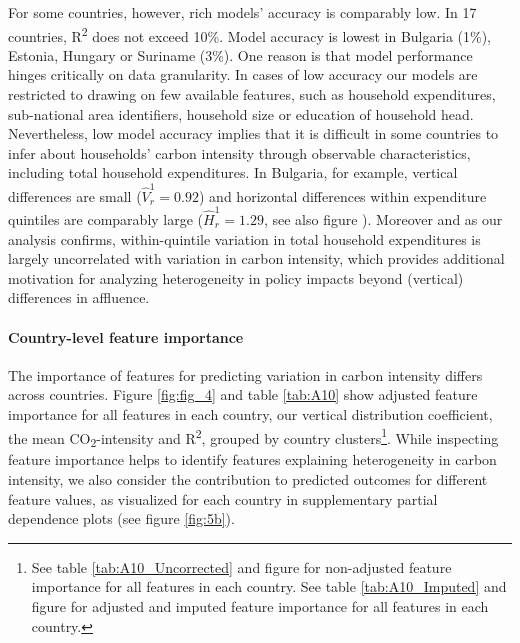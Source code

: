 \documentclass[12pt, a4paper]{article}
\begin{document}
For some countries, however, rich models' accuracy is comparably low. In 17 countries, R\textsuperscript{2} does not exceed 10\%. Model accuracy is lowest in Bulgaria (1\%), Estonia, Hungary or Suriname (3\%). One reason is that model performance hinges critically on data granularity. In cases of low accuracy our models are restricted to drawing on few available features, such as household expenditures, sub-national area identifiers, household size or education of household head. Nevertheless, low model accuracy implies that it is difficult in some countries to infer about households' carbon intensity through observable characteristics, including total household expenditures. In Bulgaria, for example, vertical differences are small ($\widehat{V}_{r}^{1}=0.92$) and horizontal differences within expenditure quintiles are comparably large ($\widehat{H}_{r}^{1}=1.29$, see also figure ). Moreover and as our analysis confirms, within-quintile variation in total household expenditures is largely uncorrelated with variation in carbon intensity, which provides additional motivation for analyzing heterogeneity in policy impacts beyond (vertical) differences in affluence.

\paragraph{Country-level feature importance}
The importance of features for predicting variation in carbon intensity differs across countries. Figure \ref{fig:fig_4} and table \ref{tab:A10} show adjusted feature importance for all features in each country, our vertical distribution coefficient, the mean CO\textsubscript{2}-intensity and R\textsuperscript{2}, grouped by country clusters\footnote{See table \ref{tab:A10_Uncorrected} and figure  for non-adjusted feature importance for all features in each country. See table \ref{tab:A10_Imputed} and figure  for adjusted and imputed feature importance for all features in each country.}. While inspecting feature importance helps to identify features explaining heterogeneity in carbon intensity, we also consider the contribution to predicted outcomes for different feature values, as visualized for each country in supplementary partial dependence plots (see figure \ref{fig:5b}).
\end{document}
